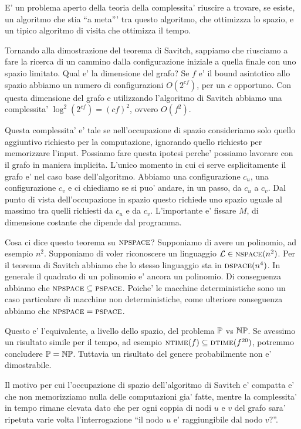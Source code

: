 E' un problema aperto della teoria della complessita' riuscire a trovare, se esiste, un algoritmo
che stia ``a meta''' tra questo algoritmo, che ottimizzza lo spazio, e un tipico algoritmo di visita
che ottimizza il tempo.

Tornando alla dimostrazione del teorema di Savitch, sappiamo che riusciamo a fare la ricerca di un
cammino dalla configurazione iniziale a quella finale con uno spazio limitato. Qual e' la dimensione
del grafo? Se $f$ e' il bound asintotico allo spazio abbiamo un numero di configurazioni
$O(2^{cf})$, per un $c$ opportuno. Con questa dimensione del grafo e utilizzando l'algoritmo di
Savitch abbiamo una complessita' $\log^{2}(2^{cf}) = (cf)^{2}$, ovvero $O(f^{2})$.

Questa complessita' e' tale se nell'occupazione di spazio consideriamo solo quello aggiuntivo
richiesto per la computazione, ignorando quello richiesto per memorizzare l'input. Possiamo fare
questa ipotesi perche' possiamo lavorare con il grafo in maniera implicita. L'unico momento in cui
ci serve esplicitamente il grafo e' nel caso base dell'algoritmo. Abbiamo una configurazione
$c_{u}$, una configurazione $c_{v}$ e ci chiediamo se si puo' andare, in un passo, da $c_{u}$ a
$c_{v}$. Dal punto di vista dell'occupazione in spazio questo richiede uno spazio uguale al massimo
tra quelli richiesti da $c_{u}$ e da $c_{v}$. L'importante e' fissare $M$, di dimensione costante
che dipende dal programma.

Cosa ci dice questo teorema su $\textsc{npspace}$? Supponiamo di avere un polinomio, ad esempio $n^{2}$.
Supponiamo di voler riconoscere un linguaggio $\mathcal{L} \in \textsc{nspace}(n^{2})$. Per il teorema di Savitch
abbiamo che lo stesso linguaggio sta in $\textsc{dspace}(n^{4})$. In generale il quadrato di un polinomio e'
ancora un polinomio. Di conseguenza abbiamo che $\textsc{npspace} \subseteq \textsc{pspace}$. Poiche' le macchine
deterministiche sono un caso particolare di macchine non deterministiche, come ulteriore conseguenza
abbiamo che $\textsc{npspace} = \textsc{pspace}$.

Questo e' l'equivalente, a livello dello spazio, del problema $\mathbb{P}$ vs $\mathbb{NP}$. Se avessimo
un risultato simile per il tempo, ad esempio $\textsc{ntime}(f) \subseteq \textsc{dtime}(f^{20})$, potremmo
concludere $\mathbb{P} = \mathbb{NP}$. Tuttavia un risultato del genere probabilmente non e' dimostrabile.

Il motivo per cui l'occupazione di spazio dell'algoritmo di Savitch e' compatta e' che non
memorizziamo nulla delle computazioni gia' fatte, mentre la complessita' in tempo rimane elevata
dato che per ogni coppia di nodi $u$ e $v$ del grafo sara' ripetuta varie volta l'interrogazione
``il nodo $u$ e' raggiungibile dal nodo $v$?''.

